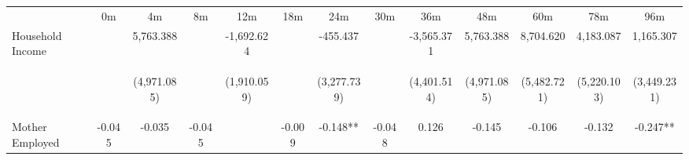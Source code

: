 \begin{tabular}{lcccccccccccc}
\hline \noalign{\smallskip} & 0m & 4m & 8m & 12m & 18m & 24m & 30m & 36m & 48m & 60m & 78m & 96m\\
\noalign{\smallskip}\hline \noalign{\smallskip}Household Income &  & 5,763.388 &  & -1,692.624 &  & -455.437 &  & -3,565.371 & 5,763.388 & 8,704.620 & 4,183.087 & 1,165.307\\
 & \begin{footnotesize}\end{footnotesize} & \begin{footnotesize}(4,971.085)\end{footnotesize} & \begin{footnotesize}\end{footnotesize} & \begin{footnotesize}(1,910.059)\end{footnotesize} & \begin{footnotesize}\end{footnotesize} & \begin{footnotesize}(3,277.739)\end{footnotesize} & \begin{footnotesize}\end{footnotesize} & \begin{footnotesize}(4,401.514)\end{footnotesize} & \begin{footnotesize}(4,971.085)\end{footnotesize} & \begin{footnotesize}(5,482.721)\end{footnotesize} & \begin{footnotesize}(5,220.103)\end{footnotesize} & \begin{footnotesize}(3,449.231)\end{footnotesize}\\
\noalign{\smallskip}Mother Employed & -0.045 & -0.035 & -0.045 &  & -0.009 & -0.148** & -0.048 & 0.126 & -0.145 & -0.106 & -0.132 & -0.247**\\

\end{tabular}
